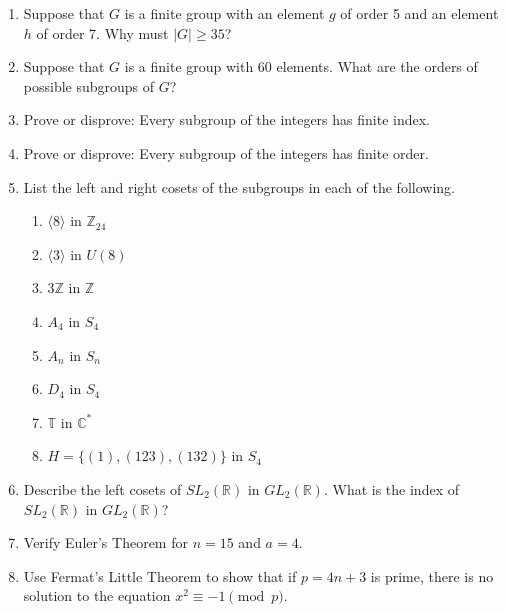 {\small
\begin{enumerate}
 
\item
Suppose that $G$ is a finite group with an element $g$ of order 5 and an element $h$ of order 7. Why must $|G| \geq 35$?
 
\item
Suppose that $G$ is a finite group with 60 elements.  What are the orders of possible subgroups of $G$?
 
\item
Prove or disprove: Every subgroup of the integers has finite index.
 
\item
Prove or disprove: Every subgroup of the integers has finite order.

\item
List the left and right cosets of the subgroups in each of the following.
\begin{multicols}{2}
\begin{enumerate}

\item 
$\langle 8 \rangle$ in ${\mathbb Z}_{24}$

\item
$\langle 3 \rangle$ in $U(8)$

\item
$3 {\mathbb Z}$ in ${\mathbb Z}$

\item
$A_4$ in $S_4$

\item
$A_n$ in $S_n$

\item
$D_4$ in $S_4$

\item
${\mathbb T}$ in ${\mathbb C}^\ast$

\item
$H = \{ (1), (123), (132) \}$ in $S_4$

\end{enumerate}
\end{multicols}
 
\item
Describe the left cosets of $SL_2( {\mathbb R} )$ in $GL_2( {\mathbb R})$.   What is the index of $SL_2( {\mathbb R} )$ in $GL_2( {\mathbb R})$?

\item
Verify Euler's Theorem for $n = 15$ and $a = 4$.

\item
Use Fermat's Little Theorem to show that if $p= 4n+3$ is prime, there is no solution to the equation $x^2 \equiv -1 \pmod{p}$.
 

\end{enumerate}}
